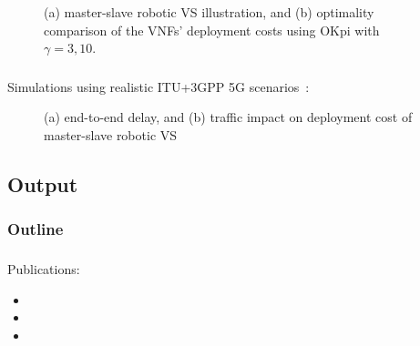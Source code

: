 \documentclass[aspectratio=169]{beamer}
\begin{document}
\begin{frame}
\begin{figure}[ht]
        \caption{(a) master-slave robotic VS illustration, and (b) optimality comparison of the VNFs' deployment costs using OKpi with $\gamma=3,10$.}
        \label{fig:fig}
    \end{figure}
\end{frame}


\begin{frame}
    \frametitle{\secname}
    \framesubtitle{\subsecname}

    Simulations using realistic ITU+3GPP 5G scenarios~\cite{modelling-bs}:
    \begin{figure}[ht]
        \hspace{2em}
        \caption{(a) end-to-end delay, and (b) traffic impact on deployment cost of master-slave robotic VS}
        \label{fig:increase-results}
    \end{figure}
\end{frame}











\subsection{Output}
\begin{frame}
    \frametitle{Outline}
    \tableofcontents[subsectionstyle=show/shaded/hide,sectionstyle=show/shaded]
\end{frame}


\begin{frame}
    \frametitle{\secname}
    \framesubtitle{\subsecname}
    Publications:
    \begin{itemize}
        \item {}
        \item {}
        \item {}
    \end{itemize}
\end{frame}
\end{document}
